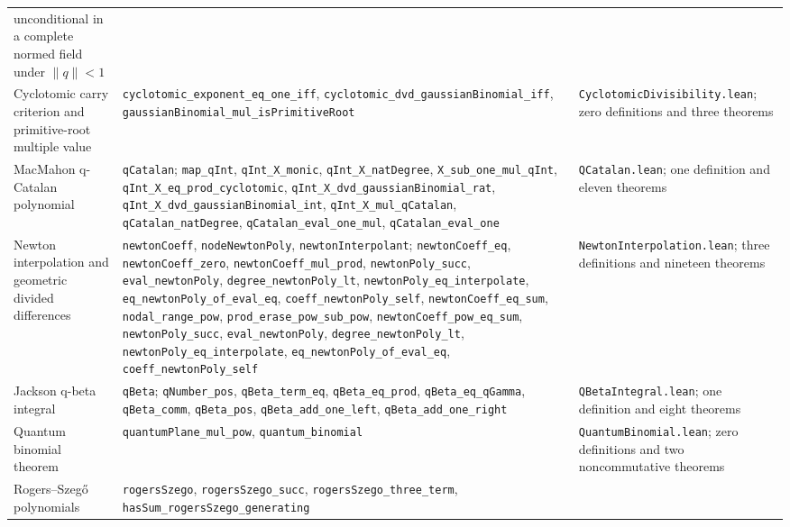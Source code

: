 \documentclass[11pt,oneside]{article}
\theoremstyle{definition}
\theoremstyle{remark}
\begin{document}
\begin{longtable}{@{}p{}p{}p{}@{}}
unconditional in a complete normed field under \(\lVert q\rVert<1\) \\
Cyclotomic carry criterion and primitive-root multiple value &
\nolinkurl{cyclotomic_exponent_eq_one_iff},
\nolinkurl{cyclotomic_dvd_gaussianBinomial_iff},
\nolinkurl{gaussianBinomial_mul_isPrimitiveRoot} &
\nolinkurl{CyclotomicDivisibility.lean}; zero definitions and three theorems \\
MacMahon q-Catalan polynomial &
\nolinkurl{qCatalan}; \nolinkurl{map_qInt}, \nolinkurl{qInt_X_monic},
\nolinkurl{qInt_X_natDegree}, \nolinkurl{X_sub_one_mul_qInt},
\nolinkurl{qInt_X_eq_prod_cyclotomic},
\nolinkurl{qInt_X_dvd_gaussianBinomial_rat},
\nolinkurl{qInt_X_dvd_gaussianBinomial_int},
\nolinkurl{qInt_X_mul_qCatalan}, \nolinkurl{qCatalan_natDegree},
\nolinkurl{qCatalan_eval_one_mul}, \nolinkurl{qCatalan_eval_one} &
\nolinkurl{QCatalan.lean}; one definition and eleven theorems \\
Newton interpolation and geometric divided differences &
\nolinkurl{newtonCoeff}, \nolinkurl{nodeNewtonPoly},
\nolinkurl{newtonInterpolant};
\nolinkurl{newtonCoeff_eq}, \nolinkurl{newtonCoeff_zero},
\nolinkurl{newtonCoeff_mul_prod}, \nolinkurl{newtonPoly_succ},
\nolinkurl{eval_newtonPoly}, \nolinkurl{degree_newtonPoly_lt},
\nolinkurl{newtonPoly_eq_interpolate},
\nolinkurl{eq_newtonPoly_of_eval_eq},
\nolinkurl{coeff_newtonPoly_self}, \nolinkurl{newtonCoeff_eq_sum},
\nolinkurl{nodal_range_pow}, \nolinkurl{prod_erase_pow_sub_pow},
\nolinkurl{newtonCoeff_pow_eq_sum}, \nolinkurl{newtonPoly_succ},
\nolinkurl{eval_newtonPoly}, \nolinkurl{degree_newtonPoly_lt},
\nolinkurl{newtonPoly_eq_interpolate},
\nolinkurl{eq_newtonPoly_of_eval_eq}, \nolinkurl{coeff_newtonPoly_self} &
\nolinkurl{NewtonInterpolation.lean}; three definitions and nineteen theorems \\
Jackson q-beta integral &
\nolinkurl{qBeta}; \nolinkurl{qNumber_pos}, \nolinkurl{qBeta_term_eq},
\nolinkurl{qBeta_eq_prod}, \nolinkurl{qBeta_eq_qGamma},
\nolinkurl{qBeta_comm}, \nolinkurl{qBeta_pos},
\nolinkurl{qBeta_add_one_left}, \nolinkurl{qBeta_add_one_right} &
\nolinkurl{QBetaIntegral.lean}; one definition and eight theorems \\
Quantum binomial theorem &
\nolinkurl{quantumPlane_mul_pow}, \nolinkurl{quantum_binomial} &
\nolinkurl{QuantumBinomial.lean}; zero definitions and two noncommutative theorems \\
Rogers--Szeg\H{o} polynomials &
\nolinkurl{rogersSzego}, \nolinkurl{rogersSzego_succ},
\nolinkurl{rogersSzego_three_term},
\nolinkurl{hasSum_rogersSzego_generating} &

\end{longtable}
\end{document}
